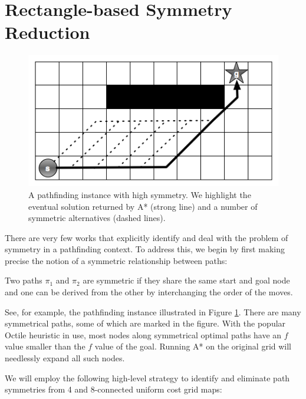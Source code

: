 \section{Rectangle-based Symmetry Reduction}
\label{rooms-based symmetry reduction}

\begin{figure}[]
       \begin{center}
                       \includegraphics[scale=0.40]{diagrams/symmetry_example.png}
       \end{center}
       \caption{A pathfinding instance with high symmetry. We highlight the
eventual solution returned by A* (strong line) and a number of symmetric 
alternatives (dashed lines).}
       \label{fig-symmetry}
		\vspace{-0.5em}
\end{figure}
There are very few works that explicitly identify and deal with the 
problem of symmetry in a pathfinding context. To address this, we begin by first
making precise the notion of a symmetric relationship between paths:
\begin{definition}
Two paths $\pi_{1}$ and $\pi_{2}$ are symmetric if they share the same start and
goal node and one can be derived from the other by interchanging the order of the
moves.
\end{definition}

See, for example, the pathfinding instance illustrated in Figure \ref{fig-symmetry}.
There are many symmetrical paths, some of which are marked in the figure.
With the popular Octile heuristic in use,
most nodes along symmetrical optimal paths have an $f$ 
value smaller than the $f$ value of the goal. 
Running A* on the original grid will needlessly expand all such nodes.

We will employ the following high-level strategy to
identify and eliminate path symmetries from 4 and 8-connected uniform cost grid maps:


